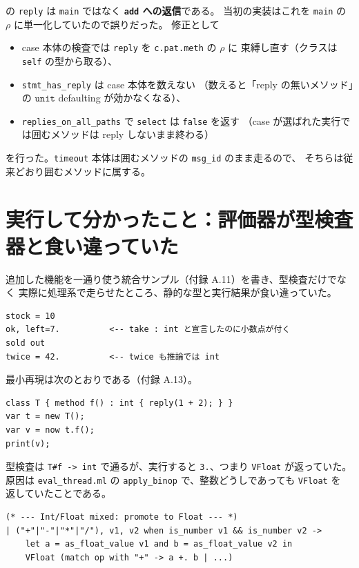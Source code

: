 \documentclass[11pt,a4paper]{ltjsarticle}
\theoremstyle{definition}
\theoremstyle{remark}
\newcommand{\ty}[1]{\ensuremath{\mathtt{#1}}}
\begin{document}
の \texttt{reply} は \texttt{main} ではなく \textbf{\texttt{add} への返信}である。
当初の実装はこれを \texttt{main} の $\rho$ に単一化していたので誤りだった。
修正として

\begin{itemize}
\item case 本体の検査では \texttt{reply} を \texttt{c.pat.meth} の $\rho$ に
  束縛し直す（クラスは \texttt{self} の型から取る）、
\item \texttt{stmt\_has\_reply} は case 本体を数えない
  （数えると「reply の無いメソッド」の \ty{unit} defaulting が効かなくなる）、
\item \texttt{replies\_on\_all\_paths} で \texttt{select} は \texttt{false} を返す
  （case が選ばれた実行では囲むメソッドは reply しないまま終わる）
\end{itemize}

を行った。\texttt{timeout} 本体は囲むメソッドの \texttt{msg\_id} のまま走るので、
そちらは従来どおり囲むメソッドに属する。

\section{実行して分かったこと：評価器が型検査器と食い違っていた}
\label{sec:runtime}

追加した機能を一通り使う統合サンプル（付録 A.11）を書き、型検査だけでなく
実際に処理系で走らせたところ、静的な型と実行結果が食い違っていた。

\begin{lstlisting}[language={}]
stock = 10
ok, left=7.          <-- take : int と宣言したのに小数点が付く
sold out
twice = 42.          <-- twice も推論では int
\end{lstlisting}

最小再現は次のとおりである（付録 A.13）。

\begin{lstlisting}[language=AIPL]
class T { method f() : int { reply(1 + 2); } }
var t = new T();
var v = now t.f();
print(v);
\end{lstlisting}

型検査は \texttt{T\#f -> int} で通るが、実行すると \texttt{3.}、つまり
\texttt{VFloat} が返っていた。原因は \texttt{eval\_thread.ml} の
\texttt{apply\_binop} で、整数どうしであっても \texttt{VFloat} を
返していたことである。

\begin{lstlisting}
(* --- Int/Float mixed: promote to Float --- *)
| ("+"|"-"|"*"|"/"), v1, v2 when is_number v1 && is_number v2 ->
    let a = as_float_value v1 and b = as_float_value v2 in
    VFloat (match op with "+" -> a +. b | ...)
\end{lstlisting}
\end{document}
